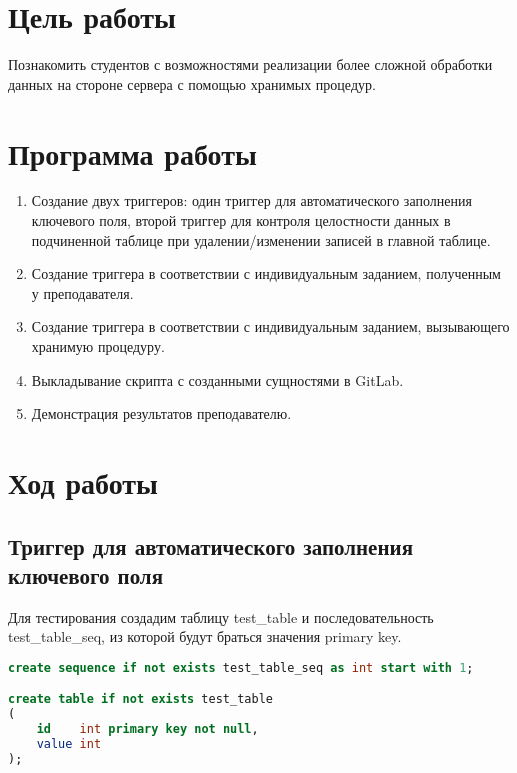 







\section{Цель работы}
Познакомить студентов с возможностями реализации более сложной обработки данных на стороне сервера с помощью хранимых процедур.

\section{Программа работы}
\begin{enumerate}
	\item Создание двух триггеров: один триггер для автоматического заполнения ключевого поля, второй триггер для контроля целостности данных в подчиненной таблице при удалении/изменении записей в главной таблице.
	\item Создание триггера в соответствии с индивидуальным заданием, полученным у преподавателя.
	\item Создание триггера в соответствии с индивидуальным заданием, вызывающего хранимую процедуру.
	\item Выкладывание скрипта с созданными сущностями в GitLab.
	\item Демонстрация результатов преподавателю.
\end{enumerate}

\section{Ход работы}
\subsection{Триггер для автоматического заполнения ключевого поля}
Для тестирования создадим таблицу test\_table и последовательность test\_table\_seq, из которой будут браться значения primary key.
\begin{lstlisting}[caption=Создание таблицы и последовательности для неё, language=SQL]
create sequence if not exists test_table_seq as int start with 1;

create table if not exists test_table
(
	id    int primary key not null,
	value int
);
\end{lstlisting}

